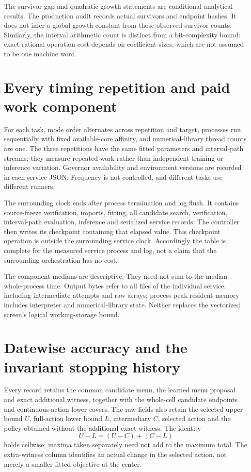 

The survivor-gap and quadratic-growth statements are conditional analytical results. The production audit records actual survivors and endpoint hashes. It does not infer a global growth constant from those observed survivor counts. Similarly, the interval arithmetic count is distinct from a bit-complexity bound: exact rational operation cost depends on coefficient sizes, which are not assumed to be one machine word.

\section{Every timing repetition and paid work component}\label{supp:timing59}



For each task, mode order alternates across repetition and target, processes run sequentially with fixed available-core affinity, and numerical-library thread counts are one. The three repetitions have the same fitted parameters and interval-path streams; they measure repeated work rather than independent training or inference variation. Governor availability and environment versions are recorded in each service JSON. Frequency is not controlled, and different tasks use different runners.

The surrounding clock ends after process termination and log flush. It contains source-freeze verification, imports, fitting, all candidate search, verification, interval-path evaluation, inference and serialized service records. The controller then writes its checkpoint containing that elapsed value. This checkpoint operation is outside the surrounding service clock. Accordingly the table is complete for the measured service process and log, not a claim that the surrounding orchestration has no cost.

The component medians are descriptive. They need not sum to the median whole-process time. Output bytes refer to all files of the individual service, including intermediate attempts and raw arrays; process peak resident memory includes interpreter and numerical-library state. Neither replaces the vectorized screen's logical working-storage bound.

\section{Datewise accuracy and the invariant stopping history}\label{supp:accuracy59}

Every record retains the common candidate menu, the learned menu proposal and exact additional witness, together with the whole-cell candidate endpoints and continuous-action lower covers. The raw fields also retain the selected upper bound $U$, full-action lower bound $L$, intermediary $C$, selected action and the policy obtained without the additional exact witness. The identity
\[
 U-L=(U-C)+(C-L)
\]
holds cellwise; maxima taken separately need not add to the maximum total. The extra-witness column identifies an actual change in the selected action, not merely a smaller fitted objective at the center.

